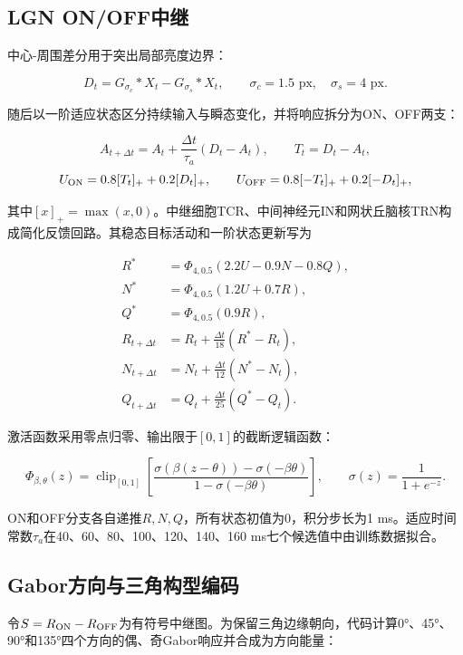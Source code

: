\documentclass[12pt,a4paper]{article}
\begin{document}
\hypertarget{lgn-onoffux4e2dux7ee7}{%
\subsection{LGN ON/OFF中继}\label{lgn-onoffux4e2dux7ee7}}

中心-周围差分用于突出局部亮度边界：

\[
D_t=G_{\sigma_c}*X_t-G_{\sigma_s}*X_t,\qquad \sigma_c=1.5\text{ px},\quad \sigma_s=4\text{ px}.
\]

随后以一阶适应状态区分持续输入与瞬态变化，并将响应拆分为ON、OFF两支：

\[
A_{t+\Delta t}=A_t+\frac{\Delta t}{\tau_a}(D_t-A_t),\qquad T_t=D_t-A_t,
\] \[
U_{\rm ON}=0.8[T_t]_++0.2[D_t]_+,\qquad
U_{\rm OFF}=0.8[-T_t]_++0.2[-D_t]_+,
\]

其中\([x]_+=\max(x,0)\)。中继细胞TCR、中间神经元IN和网状丘脑核TRN构成简化反馈回路。其稳态目标活动和一阶状态更新写为

\[
\begin{aligned}
R^*&=\Phi_{4,0.5}(2.2U-0.9N-0.8Q),\\
N^*&=\Phi_{4,0.5}(1.2U+0.7R),\\
Q^*&=\Phi_{4,0.5}(0.9R),\\
R_{t+\Delta t}&=R_t+\frac{\Delta t}{18}(R^*-R_t),\\
N_{t+\Delta t}&=N_t+\frac{\Delta t}{12}(N^*-N_t),\\
Q_{t+\Delta t}&=Q_t+\frac{\Delta t}{25}(Q^*-Q_t).
\end{aligned}
\]

激活函数采用零点归零、输出限于\([0,1]\)的截断逻辑函数：

\[
\Phi_{\beta,\theta}(z)=\operatorname{clip}_{[0,1]}\!\left[
\frac{\sigma(\beta(z-\theta))-\sigma(-\beta\theta)}
{1-\sigma(-\beta\theta)}\right],\qquad \sigma(z)=\frac{1}{1+e^{-z}}.
\]

ON和OFF分支各自递推\(R,N,Q\)，所有状态初值为0，积分步长为1 ms。适应时间常数\(\tau_a\)在40、60、80、100、120、140、160 ms七个候选值中由训练数据拟合。

\hypertarget{gaborux65b9ux5411ux4e0eux4e09ux89d2ux6784ux578bux7f16ux7801}{%
\subsection{Gabor方向与三角构型编码}\label{gaborux65b9ux5411ux4e0eux4e09ux89d2ux6784ux578bux7f16ux7801}}

令\(S=R_{\rm ON}-R_{\rm OFF}\)为有符号中继图。为保留三角边缘朝向，代码计算0°、45°、90°和135°四个方向的偶、奇Gabor响应并合成为方向能量：
\end{document}
